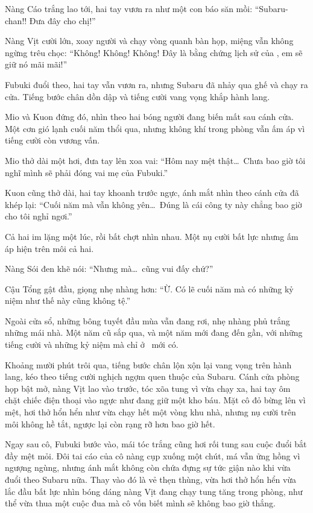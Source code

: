 \documentclass[../main.tex]{subfiles}
\begin{document}
Nàng Cáo trắng lao tới, hai tay vươn ra như một con báo săn mồi: ``Subaru-chan!! Đưa đây cho chị!''

Nàng Vịt cười lớn, xoay người và chạy vòng quanh bàn họp, miệng vẫn không ngừng trêu chọc: ``Không! Không! Không! Đây là bằng chứng lịch sử của \hll, em sẽ giữ nó mãi mãi!''

Fubuki đuổi theo, hai tay vẫn vươn ra, nhưng Subaru đã nhảy qua ghế và chạy ra cửa. Tiếng bước chân dồn dập và tiếng cười vang vọng khắp hành lang.


Mio và Kuon đứng đó, nhìn theo hai bóng người đang biến mất sau cánh cửa. Một cơn gió lạnh cuối năm thổi qua, nhưng không khí trong phòng vẫn ấm áp vì tiếng cười còn vương vấn.

Mio thở dài một hơi, đưa tay lên xoa vai: ``Hôm nay mệt thật\dots\ Chưa bao giờ tôi nghĩ mình sẽ phải đóng vai mẹ của Fubuki.''

Kuon cũng thở dài, hai tay khoanh trước ngực, ánh mắt nhìn theo cánh cửa đã khép lại: ``Cuối năm mà vẫn không yên\dots\ Đúng là cái công ty này chẳng bao giờ cho tôi nghỉ ngơi.''

Cả hai im lặng một lúc, rồi bất chợt nhìn nhau. Một nụ cười bất lực nhưng ấm áp hiện trên môi cả hai.

Nàng Sói đen khẽ nói: ``Nhưng mà\dots\ cũng vui đấy chứ?''

Cậu Tổng gật đầu, giọng nhẹ nhàng hơn: ``Ừ. Có lẽ cuối năm mà có những kỷ niệm như thế này cũng không tệ.''

Ngoài cửa sổ, những bông tuyết đầu mùa vẫn đang rơi, nhẹ nhàng phủ trắng những mái nhà. Một năm cũ sắp qua, và một năm mới đang đến gần, với những tiếng cười và những kỷ niệm mà chỉ ở \hll\ mới có.

\omk

Khoảng mười phút trôi qua, tiếng bước chân lộn xộn lại vang vọng trên hành lang, kéo theo tiếng cười nghịch ngợm quen thuộc của Subaru. Cánh cửa phòng họp bật mở, nàng Vịt lao vào trước, tóc xõa tung vì vừa chạy xa, hai tay ôm chặt chiếc điện thoại vào ngực như đang giữ một kho báu. Mặt cô đỏ bừng lên vì mệt, hơi thở hổn hển như vừa chạy hết một vòng khu nhà, nhưng nụ cười trên môi không hề tắt, ngược lại còn rạng rỡ hơn bao giờ hết.

Ngay sau cô, Fubuki bước vào, mái tóc trắng cũng hơi rối tung sau cuộc đuổi bắt đầy mệt mỏi. Đôi tai cáo của cô nàng cụp xuống một chút, má vẫn ửng hồng vì ngượng ngùng, nhưng ánh mắt không còn chứa đựng sự tức giận nào khi vừa đuổi theo Subaru nữa. Thay vào đó là vẻ thẹn thùng, vừa hơi thở hổn hển vừa lắc đầu bất lực nhìn bóng dáng nàng Vịt đang chạy tung tăng trong phòng, như thể vừa thua một cuộc đua mà cô vốn biết mình sẽ không bao giờ thắng.
\end{document}
